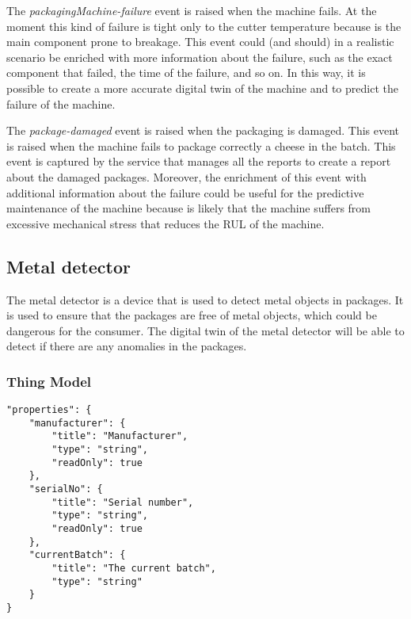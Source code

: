 The \textit{packagingMachine-failure} event is raised when the machine fails. At the moment this kind of failure is tight only to the cutter temperature because is the main component prone to breakage. This event could (and should) in a realistic scenario be enriched with more information about the failure, such as the exact component that failed, the time of the failure, and so on. In this way, it is possible to create a more accurate digital twin of the machine and to predict the failure of the machine.

The \textit{package-damaged} event is raised when the packaging is damaged. This event is raised when the machine fails to package correctly a cheese in the batch. This event is captured by the service that manages all the reports to create a report about the damaged packages.
Moreover, the enrichment of this event with additional information about the failure could be useful for the predictive maintenance of the machine
because is likely that the machine suffers from excessive mechanical stress that reduces the RUL of the machine.



\subsection{Metal detector}
The metal detector is a device that is used to detect metal objects in packages. It is used to ensure that the packages are free of metal objects, which could be dangerous for the consumer.
The digital twin of the metal detector will be able to detect if there are any anomalies in the packages.

\subsubsection{Thing Model}

\begin{lstlisting}[caption={Properties of the metal detector Thing Model.},label={lst:prop-metal}]
"properties": {
	"manufacturer": {
		"title": "Manufacturer",
		"type": "string",
		"readOnly": true
	},
	"serialNo": {
		"title": "Serial number",
		"type": "string",
		"readOnly": true
	},
	"currentBatch": {
		"title": "The current batch",
		"type": "string"
	}
}
\end{lstlisting}

